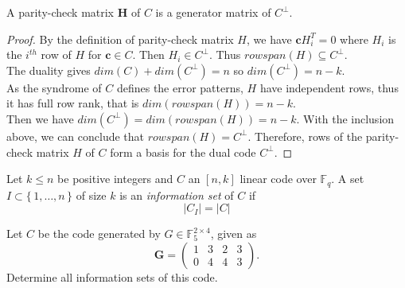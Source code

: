 \begin{proposition}
A parity-check matrix $\mathbf{H}$ of $C$ is a generator matrix of $C^\perp$. 
\end{proposition}
\begin{proof}
    By the definition of parity-check matrix $H$, we have $\mathbf{c}H_i^T=0$ where $H_i$ is the $i^{th}$ row of $H$ for $\mathbf{c}\in C$. Then $H_i\in C^\perp$. Thus $rowspan(H) \subseteq C^\perp.$\\
    The duality gives $dim(C)+dim(C^\perp)=n$ so $dim(C^\perp)=n-k$.\\
    As the syndrome of $C$ defines the error patterns, $H$ have independent rows, thus it has full row rank, that is $dim(rowspan(H))=n-k$.\\
    Then we have $dim(C^\perp)=dim(rowspan(H))=n-k$. With the inclusion above, we can conclude that $rowspan(H) = C^\perp$.
    Therefore, rows of the parity-check matrix $H$ of $C$ form a basis for the dual code $C^\perp$.
\end{proof}
\vspace{1.0cm}
\begin{definition}
Let $k \leq n$ be positive integers and $C$ an $[n, k]$ linear code over $\mathbb{F}_q$. A set $I \subset \{\,1, \dots, n\,\}$ of size $k$ is an \textit{information set} of $C$ if
\[
\left|C_I\right| = \left|C|\right. 
\]
\end{definition}
\begin{exmp}
Let $C$ be the code generated by $G \in \mathbb{F}_5^{2 \times 4}$, given as
\[
\mathbf{G} =
\begin{pmatrix}
1 & 3 & 2 & 3 \\
0 & 4 & 4 & 3
\end{pmatrix}.
\]
Determine all information sets of this code.
\end{exmp}
